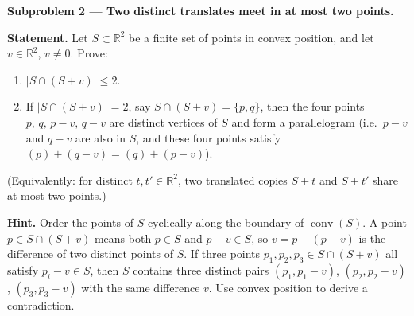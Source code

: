 \documentclass{article}
\begin{document}
\textbf{Subproblem 2 --- Two distinct translates meet in at most two points.}

\medskip
\textbf{Statement.}
Let $S\subset\mathbb{R}^2$ be a finite set of points in convex position, and let $v\in\mathbb{R}^2$, $v\neq 0$.
Prove:
\begin{enumerate}
  \item $|S\cap(S+v)| \le 2$.
  \item If $|S\cap(S+v)|=2$, say $S\cap(S+v)=\{p,q\}$, then the four points $p,\, q,\, p-v,\, q-v$ are distinct vertices of $S$ and form a parallelogram (i.e.\ $p-v$ and $q-v$ are also in $S$, and these four points satisfy $(p)+(q-v)=(q)+(p-v)$).
\end{enumerate}
(Equivalently: for distinct $t,t'\in\mathbb{R}^2$, two translated copies $S+t$ and $S+t'$ share at most two points.)

\medskip
\textbf{Hint.}
Order the points of $S$ cyclically along the boundary of $\operatorname{conv}(S)$.  A point $p\in S\cap(S+v)$ means both $p\in S$ and $p-v\in S$, so $v = p-(p-v)$ is the difference of two distinct points of $S$.  If three points $p_1,p_2,p_3\in S\cap(S+v)$ all satisfy $p_i - v\in S$, then $S$ contains three distinct pairs $(p_1, p_1-v)$, $(p_2,p_2-v)$, $(p_3,p_3-v)$ with the same difference $v$.  Use convex position to derive a contradiction.
\end{document}
